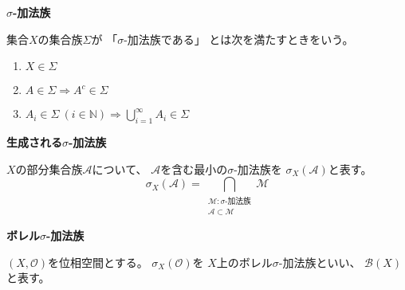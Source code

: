 \documentclass[12pt,b5paper]{ltjsarticle}
\begin{document}
\hrulefill

\textbf{$\sigma$-加法族}

集合$X$の集合族$\Sigma$が
「$\sigma$-加法族である」
とは次を満たすときをいう。
\begin{enumerate}
 \item $X \in \Sigma$
 \item $A \in \Sigma \Rightarrow A^{c}\in\Sigma$
 \item $A_{i}\in\Sigma \ (i\in\mathbb{N})
       \Rightarrow \bigcup_{i=1}^{\infty}A_{i}\in\Sigma$
\end{enumerate}

\textbf{生成される$\sigma$-加法族}

$X$の部分集合族$\mathcal{A}$について、
$\mathcal{A}$を含む最小の$\sigma$-加法族を
$\sigma_{X}(\mathcal{A})$と表す。
\begin{equation}
 \sigma_{X}(\mathcal{A})=
  \bigcap_{\substack{\mathcal{M}:\sigma\text{-加法族} \\ \mathcal{A}\subset \mathcal{M}}}\mathcal{M}
\end{equation}

\textbf{ボレル$\sigma$-加法族}

$(X,\mathcal{O})$を位相空間とする。
$\sigma_{X}(\mathcal{O})$を
$X$上のボレル$\sigma$-加法族といい、
$\mathcal{B}(X)$と表す。

\hrulefill
\end{document}
